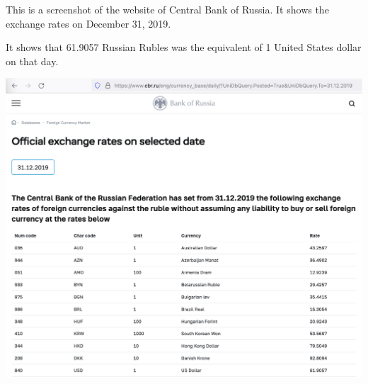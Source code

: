 
This is a screenshot of the website of Central Bank of Russia.
It shows the exchange rates on December 31, 2019.

It shows that 61.9057 Russian Rubles was the equivalent of 1 United States dollar on that day.

\includegraphics[width=\textwidth]{2019-12-31}

\pagebreak
